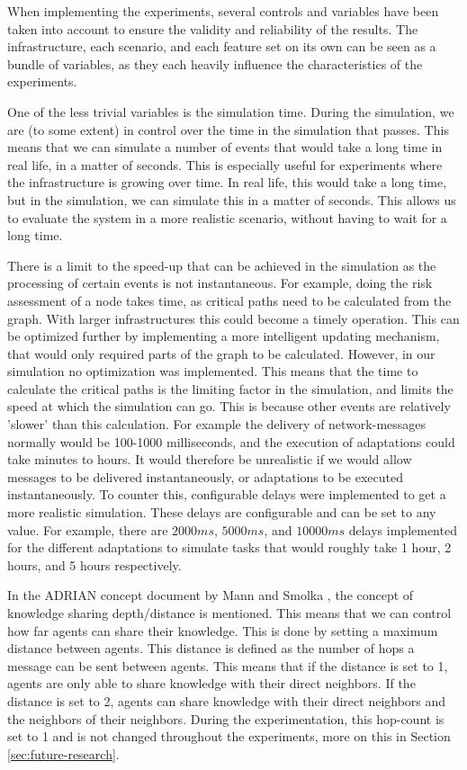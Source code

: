 When implementing the experiments, several controls and variables have been taken into account to ensure the validity and reliability of the results. The infrastructure, each scenario, and each feature set on its own can be seen as a bundle of variables, as they each heavily influence the characteristics of the experiments. 


\label{sssec:simulation-time}
One of the less trivial variables is the simulation time. During the simulation, we are (to some extent) in control over the time in the simulation that passes. This means that we can simulate a number of events that would take a long time in real life, in a matter of seconds. This is especially useful for experiments where the infrastructure is growing over time. In real life, this would take a long time, but in the simulation, we can simulate this in a matter of seconds. This allows us to evaluate the system in a more realistic scenario, without having to wait for a long time.

There is a limit to the speed-up that can be achieved in the simulation as the processing of certain events is not instantaneous. For example, doing the risk assessment of a node takes time, as critical paths need to be calculated from the graph. With larger infrastructures this could become a timely operation. This can be optimized further by implementing a more intelligent updating mechanism, that would only required parts of the graph to be calculated. However, in our simulation no optimization was implemented. 
This means that the time to calculate the critical paths is the limiting factor in the simulation, and limits the speed at which the simulation can go. This is because other events are relatively 'slower' than this calculation. For example the delivery of network-messages normally would be 100-1000 milliseconds, and the execution of adaptations could take minutes to hours.
It would therefore be unrealistic if we would allow messages to be delivered instantaneously, or adaptations to be executed instantaneously. To counter this, configurable delays were implemented to get a more realistic simulation. These delays are configurable and can be set to any value. For example, there are $2000ms$, $5000ms$, and $10000ms$ delays implemented for the different adaptations to simulate tasks that would roughly take 1 hour, 2 hours, and 5 hours respectively. 

\label{sssec:knowledge-depth}
In the ADRIAN concept document by Mann and Smolka \cite{mann2023ADRIAN}, the concept of knowledge sharing depth/distance is mentioned.  This means that we can control how far agents can share their knowledge. This is done by setting a maximum distance between agents. This distance is defined as the number of hops a message can be sent between agents. This means that if the distance is set to 1, agents are only able to share knowledge with their direct neighbors. If the distance is set to 2, agents can share knowledge with their direct neighbors and the neighbors of their neighbors. During the experimentation, this hop-count is set to 1 and is not changed throughout the experiments, more on this in Section \ref{sec:future-research}.

